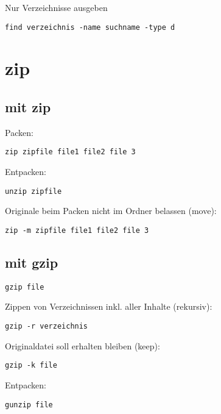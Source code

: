 \documentclass[]{book}
\begin{document}
Nur Verzeichnisse ausgeben

\begin{verbatim}
find verzeichnis -name suchname -type d
\end{verbatim}

\hypertarget{zip}{%
\section{zip}\label{zip}}

\hypertarget{mit-zip}{%
\subsection{mit zip}\label{mit-zip}}

Packen:

\begin{verbatim}
zip zipfile file1 file2 file 3
\end{verbatim}

Entpacken:

\begin{verbatim}
unzip zipfile
\end{verbatim}

Originale beim Packen nicht im Ordner belassen (move):

\begin{verbatim}
zip -m zipfile file1 file2 file 3
\end{verbatim}

\hypertarget{mit-gzip}{%
\subsection{mit gzip}\label{mit-gzip}}

\begin{verbatim}
gzip file
\end{verbatim}

Zippen von Verzeichnissen inkl. aller Inhalte (rekursiv):

\begin{verbatim}
gzip -r verzeichnis
\end{verbatim}

Originaldatei soll erhalten bleiben (keep):

\begin{verbatim}
gzip -k file
\end{verbatim}

Entpacken:

\begin{verbatim}
gunzip file
\end{verbatim}
\end{document}
